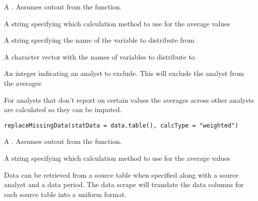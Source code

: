 \documentclass[a4paper]{book}
\begin{document}
\begin{Arguments}
\begin{ldescription}
\item[\code{valueTable}] A . Assumes outout from the
 function.

\item[\code{calcType}] A string specifying which calculation method to use for the
average values

\item[\code{fromVar}] A string specifying the name of the variable to distribute from

\item[\code{toVars}] A character vector with the names of variables to distribute to

\item[\code{excludeAnalyst}] An integer indicating an analyst to exclude. This will
exclude the analyst from the averages
\end{ldescription}
\end{Arguments}
%
\begin{Description}\relax
For analysts that don't report on certain values the averages across other
analysts are calculated so they can be imputed.
\end{Description}
%
\begin{Usage}
\begin{verbatim}
replaceMissingData(statData = data.table(), calcType = "weighted")
\end{verbatim}
\end{Usage}
%
\begin{Arguments}
\begin{ldescription}
\item[\code{statData}] A . Assumes outout from the
 function.

\item[\code{calcType}] A string specifying which calculation method to use for the
average values
\end{ldescription}
\end{Arguments}
%
\begin{Description}\relax
Data can be retrieved from a source table when specified along with a source
analyst and a data period. The data scrape will translate the data columns
for each source table into a uniform format.
\end{Description}
\end{document}

